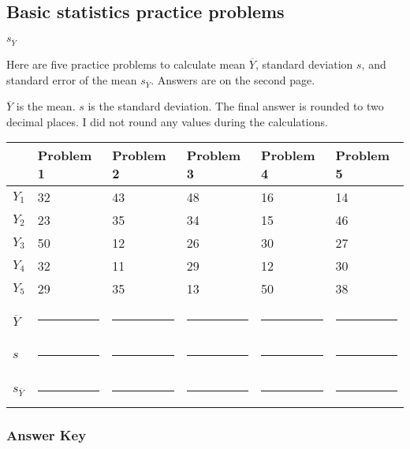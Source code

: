 \documentclass[12pt]{exam}
\begin{document}
\subsection*{Basic statistics practice problems}

$s_{\overline{Y}}$

Here are five practice problems to calculate mean $\overline{Y}$, standard deviation $s$, and standard error of the mean $s_{\overline{Y}}$.  Answers are on the second page.

$\overline{Y}$ is the mean. $s$ is the standard deviation. The final answer is rounded to two decimal places. I did not round any values during the calculations.


\begin{tabular}[l]{@{}R{0.5in}R{0.75in}R{0.75in}R{0.75in}R{0.75in}R{0.75in}@{}}	
\toprule
	& Problem 1	& Problem 2	& Problem 3	& Problem 4	& Problem 5\\
\midrule
$Y_1$	& 32	& 43	& 48	& 16	& 14\\
$Y_2$	& 23	& 35	& 34	& 15	& 46\\
$Y_3$	& 50	& 12	& 26	& 30	& 27\\
$Y_4$	& 32	& 11	& 29	& 12	& 30\\
$Y_5$	& 29	& 35	& 13	& 50	& 38\\
& 	& 	& 	& \\
$\overline{Y}$	& \rule{0.5in}{0.4pt}	& \rule{0.5in}{0.4pt}	& \rule{0.5in}{0.4pt}	& \rule{0.5in}{0.4pt}	& \rule{0.5in}{0.4pt}\\
&	&	&	& \\
$s$	& \rule{0.5in}{0.4pt}	& \rule{0.5in}{0.4pt}	& \rule{0.5in}{0.4pt}	& \rule{0.5in}{0.4pt}	& \rule{0.5in}{0.4pt}\\
&	&	&	& \\
$s_{\overline{Y}}$	& \rule{0.5in}{0.4pt}	& \rule{0.5in}{0.4pt}	& \rule{0.5in}{0.4pt}	& \rule{0.5in}{0.4pt}	& \rule{0.5in}{0.4pt}\\
\bottomrule
\end{tabular}

\newpage

\subsubsection*{Answer Key}
\end{document}
